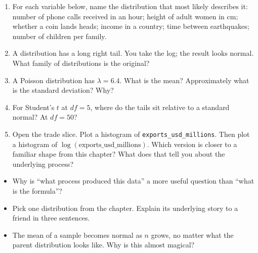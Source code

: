 \documentclass[
  letterpaper,
  11pt,
  twoside,
  openany]{scrbook}
\providecommand{\tightlist}{%
  \setlength{\itemsep}{0pt}\setlength{\parskip}{0pt}}
\begin{document}
\begin{enumerate}
\def\labelenumi{\arabic{enumi}.}
\item
  For each variable below, name the distribution that most likely
  describes it: number of phone calls received in an hour; height of
  adult women in cm; whether a coin lands heads; income in a country;
  time between earthquakes; number of children per family.
\item
  A distribution has a long right tail. You take the log; the result
  looks normal. What family of distributions is the original?
\item
  A Poisson distribution has \(\lambda = 6.4\). What is the mean?
  Approximately what is the standard deviation? Why?
\item
  For Student's \(t\) at \(df = 5\), where do the tails sit relative to
  a standard normal? At \(df = 50\)?
\item
  Open the trade slice. Plot a histogram of
  \texttt{exports\_usd\_millions}. Then plot a histogram of
  \(\log(\text{exports_usd_millions})\). Which version is closer to a
  familiar shape from this chapter? What does that tell you about the
  underlying process?
\end{enumerate}

\begin{tcolorbox}[enhanced jigsaw, arc=.35mm, bottomrule=.15mm, bottomtitle=1mm, breakable, colback=white, colbacktitle=quarto-callout-caution-color!10!white, colframe=quarto-callout-caution-color-frame, coltitle=black, left=2mm, leftrule=.75mm, opacityback=0, opacitybacktitle=0.6, rightrule=.15mm, title=\textcolor{quarto-callout-caution-color}{\faFire}\hspace{0.5em}{Reflect before moving on}, titlerule=0mm, toprule=.15mm, toptitle=1mm]

\begin{itemize}
\tightlist
\item
  Why is ``what process produced this data'' a more useful question than
  ``what is the formula''?
\item
  Pick one distribution from the chapter. Explain its underlying story
  to a friend in three sentences.
\item
  The mean of a sample becomes normal as \(n\) grows, no matter what the
  parent distribution looks like. Why is this almost magical?
\end{itemize}

\end{tcolorbox}
\end{document}
